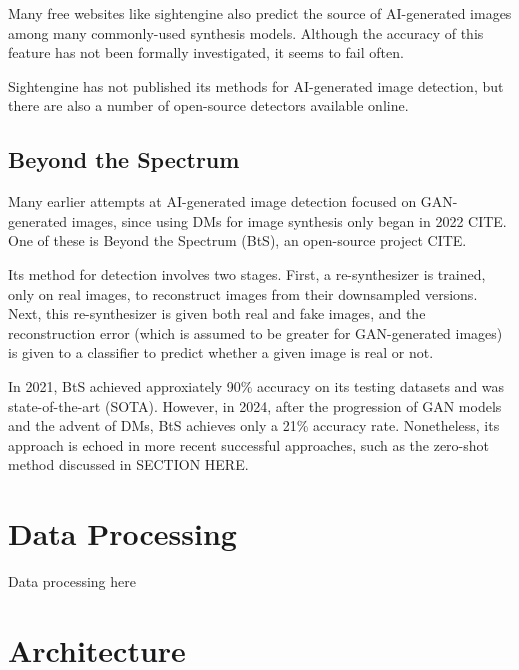 \documentclass{article} %
\begin{document}
Many free websites like sightengine also predict the source of AI-generated images among many commonly-used synthesis models. Although the accuracy of this feature has not been formally investigated, it seems to fail often.

Sightengine has not published its methods for AI-generated image detection, but there are also a number of open-source detectors available online.

\subsection{Beyond the Spectrum}

Many earlier attempts at AI-generated image detection focused on GAN-generated images, since using DMs for image synthesis only began in 2022 CITE. One of these is Beyond the Spectrum (BtS), an open-source project CITE.

Its method for detection involves two stages. First, a re-synthesizer is trained, only on real images, to reconstruct images from their downsampled versions. Next, this re-synthesizer is given both real and fake images, and the reconstruction error (which is assumed to be greater for GAN-generated images) is given to a classifier to predict whether a given image is real or not.

In 2021, BtS achieved approxiately 90\% accuracy on its testing datasets and was state-of-the-art (SOTA). However, in 2024, after the progression of GAN models and the advent of DMs, BtS achieves only a 21\% accuracy rate. Nonetheless, its approach is echoed in more recent successful approaches, such as the zero-shot method discussed in SECTION HERE.

\subsection{}


\section{Data Processing}
\label{data}

Data processing here

\section{Architecture}
\label{arch}
\end{document}
